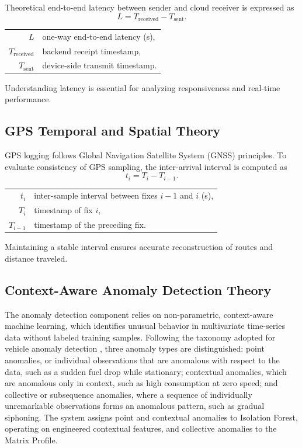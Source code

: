 Theoretical end-to-end latency between sender and cloud receiver is expressed as
%
\begin{equation}
L = T_{\text{received}} - T_{\text{sent}}.
\label{eq:latency-ch3}
\end{equation}
\begin{tabular}{@{}r@{~=~}l@{}}
$L$ & one-way end-to-end latency (s), \\
$T_{\text{received}}$ & backend receipt timestamp, \\
$T_{\text{sent}}$ & device-side transmit timestamp.
\end{tabular}

\vspace{0.5em}
Understanding latency is essential for analyzing responsiveness and real-time performance.

\subsection{GPS Temporal and Spatial Theory}

GPS logging follows Global Navigation Satellite System (GNSS) principles. To evaluate consistency of GPS sampling, the inter-arrival interval is computed as
%
\begin{equation}
t_i = T_i - T_{i-1}.
\label{eq:gps-ch3}
\end{equation}
\begin{tabular}{@{}r@{~=~}l@{}}
$t_i$ & inter-sample interval between fixes $i-1$ and $i$ (s), \\
$T_i$ & timestamp of fix $i$, \\
$T_{i-1}$ & timestamp of the preceding fix.
\end{tabular}

\vspace{0.5em}
Maintaining a stable interval ensures accurate reconstruction of routes and distance traveled.

\subsection{Context-Aware Anomaly Detection Theory}
\label{sec:anomaly_detection_theory}

The anomaly detection component relies on non-parametric, context-aware machine learning, which identifies unusual behavior in multivariate time-series data without labeled training samples. Following the taxonomy adopted for vehicle anomaly detection \cite{hirth2025truck_survey}, three anomaly types are distinguished: point anomalies, or individual observations that are anomalous with respect to the data, such as a sudden fuel drop while stationary; contextual anomalies, which are anomalous only in context, such as high consumption at zero speed; and collective or subsequence anomalies, where a sequence of individually unremarkable observations forms an anomalous pattern, such as gradual siphoning. The system assigns point and contextual anomalies to Isolation Forest, operating on engineered contextual features, and collective anomalies to the Matrix Profile.

